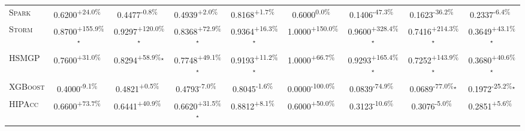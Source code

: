 \begin{table}[htbp]
\begin{tabular}{l|cccc|cccc}
\textsc{Spark} & \cellcolor{green!30}0.6200\textsuperscript{+24.0\%}$^{\,\,\,}$ & \cellcolor{red!30}0.4477\textsuperscript{-0.8\%}$^{\,\,\,}$ & \cellcolor{green!30}0.4939\textsuperscript{+2.0\%}$^{\,\,\,}$ & \cellcolor{green!30}0.8168\textsuperscript{+1.7\%}$^{\,\,\,}$ & \cellcolor{red!30}0.6000\textsuperscript{0.0\%}$^{\,\,\,}$ & \cellcolor{red!30}0.1406\textsuperscript{-47.3\%}$^{\,\,\,}$ & \cellcolor{red!30}0.1623\textsuperscript{-36.2\%}$^{\,\,\,}$ & \cellcolor{red!30}0.2337\textsuperscript{-6.4\%}$^{\,\,\,}$ \\
\textsc{Storm} & \cellcolor{green!30}0.8700\textsuperscript{+155.9\%}$^\star$ & \cellcolor{green!30}0.9297\textsuperscript{+120.0\%}$^\star$ & \cellcolor{green!30}0.8368\textsuperscript{+72.9\%}$^\star$ & \cellcolor{green!30}0.9364\textsuperscript{+16.3\%}$^\star$ & \cellcolor{green!30}1.0000\textsuperscript{+150.0\%}$^{\,\,\,}$ & \cellcolor{green!30}0.9600\textsuperscript{+328.4\%}$^\star$ & \cellcolor{green!30}0.7416\textsuperscript{+214.3\%}$^\star$ & \cellcolor{green!30}0.3649\textsuperscript{+43.1\%}$^\star$ \\
\textsc{HSMGP} & \cellcolor{green!30}0.7600\textsuperscript{+31.0\%}$^{\,\,\,}$ & \cellcolor{green!30}0.8294\textsuperscript{+58.9\%}$^\star$ & \cellcolor{green!30}0.7748\textsuperscript{+49.1\%}$^\star$ & \cellcolor{green!30}0.9193\textsuperscript{+11.2\%}$^\star$ & \cellcolor{green!30}1.0000\textsuperscript{+66.7\%}$^{\,\,\,}$ & \cellcolor{green!30}0.9293\textsuperscript{+165.4\%}$^\star$ & \cellcolor{green!30}0.7252\textsuperscript{+143.9\%}$^\star$ & \cellcolor{green!30}0.3680\textsuperscript{+40.6\%}$^\star$ \\
\textsc{XGBoost} & \cellcolor{red!30}0.4000\textsuperscript{-9.1\%}$^{\,\,\,}$ & \cellcolor{green!30}0.4821\textsuperscript{+0.5\%}$^{\,\,\,}$ & \cellcolor{red!30}0.4793\textsuperscript{-7.0\%}$^{\,\,\,}$ & \cellcolor{red!30}0.8045\textsuperscript{-1.6\%}$^{\,\,\,}$ & \cellcolor{red!30}0.0000\textsuperscript{-100.0\%}$^{\,\,\,}$ & \cellcolor{red!30}0.0839\textsuperscript{-74.9\%}$^{\,\,\,}$ & \cellcolor{red!30}0.0689\textsuperscript{-77.0\%}$^\star$ & \cellcolor{red!30}0.1972\textsuperscript{-25.2\%}$^\star$ \\
\textsc{HIPAcc} & \cellcolor{green!30}0.6600\textsuperscript{+73.7\%}$^{\,\,\,}$ & \cellcolor{green!30}0.6441\textsuperscript{+40.9\%}$^{\,\,\,}$ & \cellcolor{green!30}0.6620\textsuperscript{+31.5\%}$^\star$ & \cellcolor{green!30}0.8812\textsuperscript{+8.1\%}$^{\,\,\,}$ & \cellcolor{green!30}0.6000\textsuperscript{+50.0\%}$^{\,\,\,}$ & \cellcolor{red!30}0.3123\textsuperscript{-10.6\%}$^{\,\,\,}$ & \cellcolor{red!30}0.3076\textsuperscript{-5.0\%}$^{\,\,\,}$ & \cellcolor{green!30}0.2851\textsuperscript{+5.6\%}$^{\,\,\,}$ \\

\end{tabular}
\end{table}
